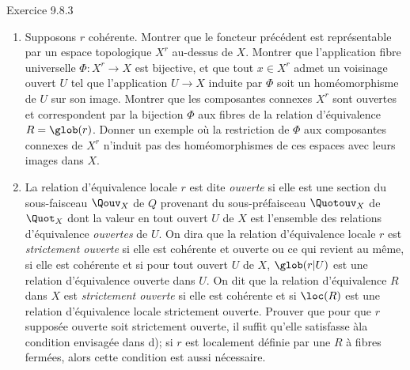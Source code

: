 \documentclass[10pt]{../fichiers-configuration-latex/smfart}
\begin{document}
\begin{enonce*}[remark]{Exercice 9.8.3}
\begin{enumerate}
\item Supposons $r$ cohérente. Montrer que le foncteur précédent est
représentable par un espace topologique $X^r$ au-dessus de $X$.
Montrer que l'application fibre universelle $\Phi:X^r\rightarrow X$
est bijective, et que tout $x\in X^r$ admet un voisinage ouvert $U$
tel que l'application $U\rightarrow X$ induite par $\Phi$ soit un
homéomorphisme de $U$ sur son image. Montrer que les composantes
connexes $X^r$ sont ouvertes et correspondent par la bijection
$\Phi$ aux fibres de la relation d'équivalence $R=\glob(r)$. Donner
un exemple où la restriction de $\Phi$ aux composantes connexes de
$X^r$ n'induit pas des homéomorphismes de ces espaces avec leurs
images dans $X$.

\item La relation d'équivalence locale $r$ est dite \emph{ouverte} si
elle est une section du sous-faisceau $\Qouv_X$ de $Q$ provenant du
sous-préfaisceau $\Quotouv_X$ de $\Quot_X$ dont la valeur en tout
ouvert $U$ de $X$ est l'ensemble des relations d'équivalence
\emph{ouvertes} de $U$. On dira que la relation d'équivalence locale
$r$ est \emph{strictement ouverte} si elle est cohérente et ouverte
ou ce qui revient au même, si elle est cohérente et si pour tout
ouvert $U$ de $X$, $\glob(r| U)$ est une relation d'équivalence
ouverte dans $U$. On dit que la relation d'équivalence $R$ dans $X$
est \emph{strictement ouverte} si elle est cohérente et si $\loc(R)$
est une relation d'équivalence locale strictement ouverte. Prouver
que pour que $r$ supposée ouverte soit strictement ouverte, il
suffit qu'elle satisfasse à\pageoriginale la condition envisagée
dans d); si $r$ est localement définie par une $R$ à fibres fermées,
alors cette condition est aussi nécessaire.


\end{enumerate}
\end{enonce*}
\end{document}
